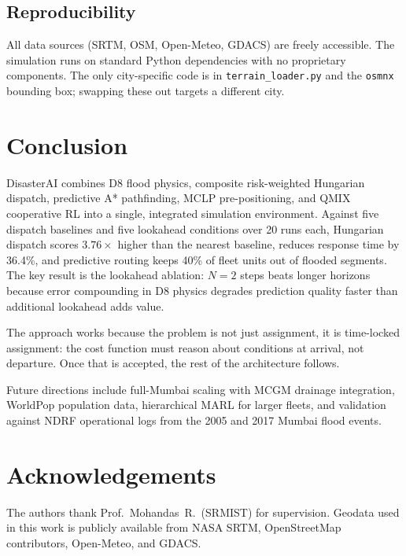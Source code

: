 \documentclass[conference]{IEEEtran}
\begin{document}
\subsection{Reproducibility}

All data sources (SRTM, OSM, Open-Meteo, GDACS) are freely accessible.
The simulation runs on standard Python dependencies with no proprietary
components.
The only city-specific code is in \texttt{terrain\_loader.py} and the
\texttt{osmnx} bounding box; swapping these out targets a different city.

\section{Conclusion}
\label{sec:conc}

DisasterAI combines D8 flood physics, composite risk-weighted Hungarian
dispatch, predictive A* pathfinding, MCLP pre-positioning, and QMIX
cooperative RL into a single, integrated simulation environment.
Against five dispatch baselines and five lookahead conditions over 20 runs
each, Hungarian dispatch scores $3.76\times$ higher than the nearest baseline,
reduces response time by 36.4\%, and predictive routing keeps 40\% of fleet
units out of flooded segments.
The key result is the lookahead ablation: $N=2$ steps beats longer horizons
because error compounding in D8 physics degrades prediction quality faster
than additional lookahead adds value.

The approach works because the problem is not just assignment, it is
time-locked assignment: the cost function must reason about conditions at
arrival, not departure.
Once that is accepted, the rest of the architecture follows.

Future directions include full-Mumbai scaling with MCGM drainage integration,
WorldPop population data, hierarchical MARL for larger fleets, and validation
against NDRF operational logs from the 2005 and 2017 Mumbai flood events.

\section*{Acknowledgements}

The authors thank Prof.\ Mohandas~R.\ (SRMIST) for supervision.
Geodata used in this work is publicly available from NASA SRTM,
OpenStreetMap contributors, Open-Meteo, and GDACS.
\end{document}
